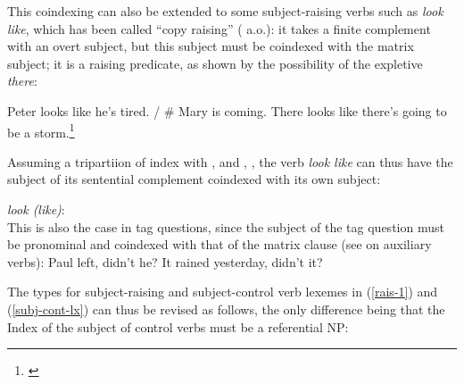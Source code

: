 This coindexing can also be extended to some subject-raising verbs such as \emph{look like}, which
has been called ``copy raising'' (\citealp{Rogers74a-u,Hornstein99a-u} a.o.): it takes a finite
complement with an overt subject, but this subject must be coindexed with the matrix
subject; it is a raising predicate, as shown by the possibility of the expletive \emph{there}:

\eal
\ex Peter looks like he's tired. / \# Mary is coming.
\ex There looks like there's going to be a storm.\footnote{
\citet[]{Sag2007a}
}
\zl

Assuming a tripartiion of index with ,  and , \citep[]{ps2}, the verb \emph{look like} can thus have the subject of its sentential complement
coindexed with its own subject:

\ea
\emph{look (like)}:\\
\z
This is also the case in  tag questions, since the  subject of the tag question must be
pronominal and coindexed with that of the matrix clause (see \citealt[Section~4]{BF99a} on auxiliary verbs):
\eal
\ex Paul left, didn't he?
\ex It rained yesterday, didn't it?
\zl

\noindent
The types for subject-raising and subject-control verb lexemes in (\ref{rais-1}) and (\ref{subj-cont-lx}) can thus be revised  as follows, the only difference being that the Index of the subject of control verbs must be a referential NP:
\eal
\ex {}  \impl {} 
\ex {} \impl {}
\zl
{}

